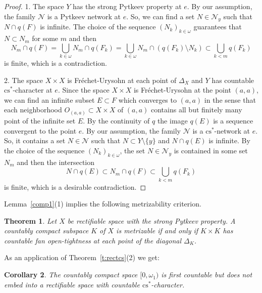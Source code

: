 \documentclass{amsart}
\newtheorem{theorem}{Theorem}[section]
\newtheorem{corollary}[theorem]{Corollary}
\theoremstyle{definition}
\begin{document}
\begin{proof}
1. The space $Y$ has the strong Pytkeev property at $e$. By our assumption, the family $\mathcal N$ is a Pytkeev network at $e$. So, we can find a set $N\in\mathcal N_y$ such that $N\cap q(F)$ is infinite. The choice of the sequence $(N_k)_{k\in{\omega}}$ guarantees that $N\subset N_m$ for some $m$ and then $$N_m\cap q(F)=\bigcup_{k\in{\omega}}N_m\cap q(F_k)=\bigcup_{k\in{\omega}}N_m\cap(q(F_k)\setminus N_k)\subset \bigcup_{k<m}q(F_k)$$ is finite, which is a contradiction.
\smallskip

2. The space $X\times X$ is Fr\'echet-Urysohn at each point of $\Delta_X$ and $Y$ has countable ${\mathrm{cs}}^*$-character at $e$. Since the space $X\times X$ is Fr\'echet-Urysohn at the point $(a,a)$,
we can find an infinite subset $E\subset F$ which converges to $(a,a)$ in the sense that each neighborhood $O_{(a,a)}\subset X\times X$ of $(a,a)$ contains all but finitely many point of the infinite set $E$. By the continuity of $q$ the image $q(E)$ is a sequence convergent to the point $e$.
By our assumption, the family $\mathcal N$ is a ${\mathrm{cs}}^*$-network at $e$. So, it contains a set $N\in\mathcal N$ such that $N\subset Y\setminus\{y\}$ and $N\cap q(E)$ is infinite. By the choice of the sequence $(N_k)_{k\in{\omega}}$, the set $N\in\mathcal N_y$  is contained in some set $N_m$ and then the intersection
$$N\cap q(E)\subset N_m\cap q(F)\subset \bigcup_{k< m}q(F_k)$$ is finite, which is a desirable contradiction.
\end{proof}

Lemma~\ref{comp1}(1) implies the following metrizability criterion.

\begin{theorem}\label{t:comp1} Let $X$ be rectifiable space with the strong Pytkeev property. A countably compact subspace $K$ of $X$ is metrizable if and only if $K\times K$ has countable fan open-tightness at each point of the diagonal $\Delta_K$.
\end{theorem}

As an application of Theorem~\ref{t:rectcs}(2) we get:

\begin{corollary} The countably compact space $[0,{\omega}_1)$ is first countable but does not embed into a rectifiable space with countable ${\mathrm{cs}}^*$-character.
\end{corollary}
\end{document}
